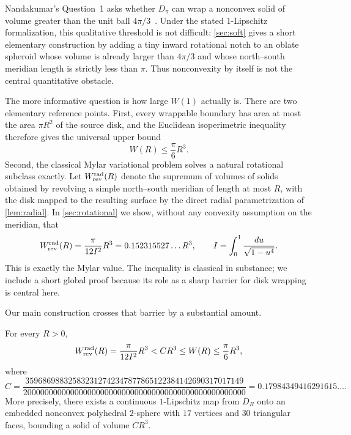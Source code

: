 Nandakumar's Question~1 asks whether $D_\pi$ can wrap a nonconvex solid of volume greater than the unit ball $4\pi/3$~\cite[Question~1]{Nandakumar2026}.  Under the stated $1$-Lipschitz formalization, this qualitative threshold is not difficult: \cref{sec:soft} gives a short elementary construction by adding a tiny inward rotational notch to an oblate spheroid whose volume is already larger than $4\pi/3$ and whose north--south meridian length is strictly less than $\pi$.  Thus nonconvexity by itself is not the central quantitative obstacle.

The more informative question is how large $W(1)$ actually is.  There are two elementary reference points.  First, every wrappable boundary has area at most the area $\pi R^2$ of the source disk, and the Euclidean isoperimetric inequality therefore gives the universal upper bound
\begin{equation}\label{eq:universalupperintro}
W(R)\le \frac{\pi}{6}R^3.
\end{equation}
Second, the classical Mylar variational problem solves a natural rotational subclass exactly.  Let $W_{\rm rev}^{\rm rad}(R)$ denote the supremum of volumes of solids obtained by revolving a simple north--south meridian of length at most $R$, with the disk mapped to the resulting surface by the direct radial parametrization of \cref{lem:radial}.  In \cref{sec:rotational} we show, without any convexity assumption on the meridian, that
\begin{equation}\label{eq:rotintro}
W_{\rm rev}^{\rm rad}(R)
=\frac{\pi}{12I^2}R^3
=0.152315527\ldots R^3,
\qquad
I=\int_0^1\frac{du}{\sqrt{1-u^4}}.
\end{equation}
This is exactly the Mylar value.  The inequality is classical in substance; we include a short global proof because its role as a sharp barrier for disk wrapping is central here.

Our main construction crosses that barrier by a substantial amount.

\begin{theorem}\label{thm:main}
For every $R>0$,
\begin{equation}\label{eq:mainchain}
W_{\rm rev}^{\rm rad}(R)
=\frac{\pi}{12I^2}R^3
< C R^3
\le W(R)
\le \frac{\pi}{6}R^3,
\end{equation}
where
\begin{equation}\label{eq:Cexact}
C=
\frac{
359686988325832312742347877865122384142690317017149
}{
2000000000000000000000000000000000000000000000000000
}
=0.17984349416291615\ldots .
\end{equation}
More precisely, there exists a continuous $1$-Lipschitz map from $D_R$ onto an embedded nonconvex polyhedral $2$-sphere with $17$ vertices and $30$ triangular faces, bounding a solid of volume $C R^3$.
\end{theorem}

